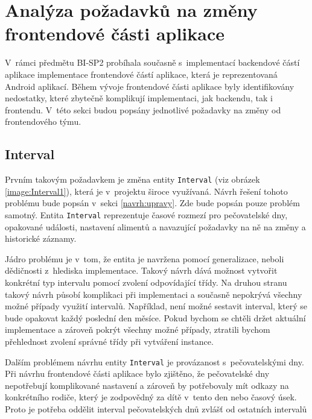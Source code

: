 \section{Analýza požadavků na změny frontendové části aplikace}\label{analyza:pozadavky-frontendu}
    V~rámci předmětu BI-SP2 probíhala současně s~implementací backendové částí aplikace implementace frontendové částí aplikace, která je reprezentovaná Android aplikací. Během vývoje frontendové části aplikace byly identifikovány nedostatky, které zbytečně komplikují implementaci, jak backendu, tak i frontendu. V~této sekci budou popsány jednotlivé požadavky na změny od frontendového týmu.
    
    \subsection{Interval}\label{analyza:pozadavky:interval}
        Prvním takovým požadavkem je změna entity \verb|Interval| (viz obrázek \ref{image:Interval1}), která je v~projektu široce využívaná. Návrh řešení tohoto problému bude popsán v~sekci \ref{navrh:upravy}. Zde bude popsán pouze problém samotný. Entita \verb|Interval| reprezentuje časové rozmezí pro pečovatelské dny, opakované události, nastavení alimentů a navazující požadavky na ně na změny a historické záznamy.
            
        Jádro problému je v~tom, že entita je navržena pomocí generalizace, neboli dědičnosti z~hlediska implementace. Takový návrh dává možnost vytvořit konkrétní typ intervalu pomocí zvolení odpovídající třídy. Na druhou stranu takový návrh působí komplikaci při implementaci a současně nepokrývá všechny možné případy využití intervalů. Například, není možné sestavit interval, který se bude opakovat každý poslední den měsíce. Pokud bychom se chtěli držet aktuální implementace a zároveň pokrýt všechny možné případy, ztratili bychom přehlednost zvolení správné třídy při vytváření instance.
            
        Dalším problémem návrhu entity \verb|Interval| je provázanost s~pečovatelskými dny. Při návrhu frontendové části aplikace bylo zjištěno, že pečovatelské dny nepotřebují komplikované nastavení a zároveň by potřebovaly mít odkazy na konkrétního rodiče, který je zodpovědný za dítě v~tento den nebo časový úsek. Proto je potřeba oddělit interval pečovatelských dnů zvlášť od ostatních intervalů
    
